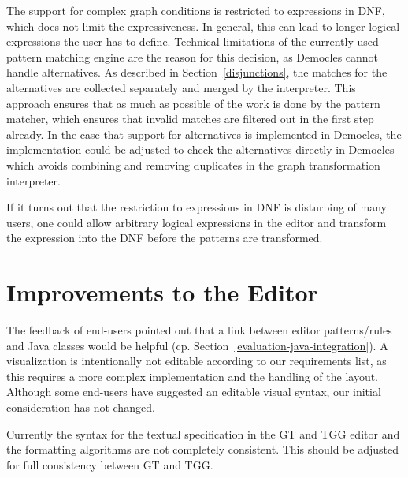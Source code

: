 The support for complex graph conditions is restricted to expressions in DNF, which does not limit the expressiveness.
In general, this can lead to longer logical expressions the user has to define.
Technical limitations of the currently used pattern matching engine are the reason for this decision, as Democles cannot handle alternatives.
As described in Section~\ref{disjunctions}, the matches for the alternatives are collected separately and merged by the interpreter.
This approach ensures that as much as possible of the work is done by the pattern matcher, which ensures that invalid matches are filtered out in the first step already.
In the case that support for alternatives is implemented in Democles, the implementation could be adjusted to check the alternatives directly in Democles which avoids combining and removing duplicates in the graph transformation interpreter.

If it turns out that the restriction to expressions in DNF is disturbing of many users, one could allow arbitrary logical expressions in the editor and transform the expression into the DNF before the patterns are transformed.

\section{Improvements to the Editor}
\label{improvements-to-the-editor}
The feedback of end-users pointed out that a link between editor patterns/rules and Java classes would be helpful (cp. Section~\ref{evaluation-java-integration}).
A visualization is intentionally not editable according to our requirements list, as this requires a more complex implementation and the handling of the layout.
Although some end-users have suggested an editable visual syntax, our initial consideration has not changed.

Currently the syntax for the textual specification in the GT and TGG editor and the formatting algorithms are not completely consistent.
This should be adjusted for full consistency between GT and TGG.
